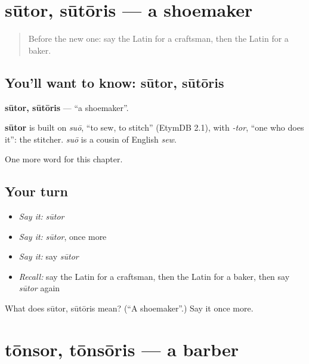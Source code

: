 \section[sūtor, sūtōris]{sūtor, sūtōris — a shoemaker}

\label{lesson:LA-C137-sutor}



\begin{quote}
Before the new one: say the Latin for a craftsman, then the Latin for a baker.
\end{quote}

\subsection*{You'll want to know: sūtor, sūtōris}
\textbf{sūtor, sūtōris} — \textquotedblleft{}a shoemaker\textquotedblright{}.

\begin{cousinweb}
\textbf{sūtor} is built on \emph{suō}, \textquotedblleft{}to sew, to stitch\textquotedblright{} (EtymDB 2.1), with \emph{-tor}, \textquotedblleft{}one who does it\textquotedblright{}: the stitcher. \emph{suō} is a cousin of English \emph{sew}.
\end{cousinweb}

\begin{grammarlens}[title={What you've built}]
One more word for this chapter.
\end{grammarlens}

\subsection*{Your turn}
\begin{itemize}
\raggedright
  \item \emph{Say it:} \emph{sūtor}
  \item \emph{Say it:} \emph{sūtor}, once more
  \item \emph{Say it:} say \emph{sūtor}
  \item \emph{Recall:} say the Latin for a craftsman, then the Latin for a baker, then say \emph{sūtor} again
\end{itemize}

\begin{tcolorbox}[breakable,colback=teal!4,colframe=teal!35!black,title={Before you move on}]
What does sūtor, sūtōris mean? (\textquotedblleft{}A shoemaker\textquotedblright{}.) Say it once more.
\end{tcolorbox}
\section[tōnsor, tōnsōris]{tōnsor, tōnsōris — a barber}


